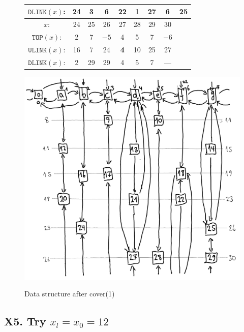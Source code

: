\documentclass[a4paper,landscape,11pt]{article}
\begin{document}
\begin{figure}[H]
\begin{minipage}[t]{0.48\linewidth}
\begin{tabular}{c c c c c c c c c}
			$\texttt{DLINK}(x)$: & 24         & 3  & \textbf{6} & 22         & 1           & 27 & 6           & 25   \\
			\hline
			$x$:                 & 24         & 25 & 26         & 27         & 28          & 29 & 30          &      \\
			$\texttt{TOP}(x)$:   & 2          & 7  & $-5$       & 4          & 5           & 7  & $-6$        &      \\
			$\texttt{ULINK}(x)$: & 16         & 7  & 24         & \textbf{4} & 10          & 25 & 27          &      \\
			$\texttt{DLINK}(x)$: & 2          & 29 & 29         & 4          & 5           & 7  & ---         &      \\
		\end{tabular}
		\label{tab:mem_layout_after_cover_1}
	\end{minipage}
	\hfill
	\begin{minipage}[t]{0.48\linewidth}
		\centering
		\caption{Data structure after cover(1)}
		\includegraphics[width=\linewidth]{vol4b_ex11_p125_2.png}
		\label{fig:data_structure_after_cover_1}
	\end{minipage}
\end{figure}

\subsection{X5. Try $x_l = x_0 = 12$}
\end{document}
